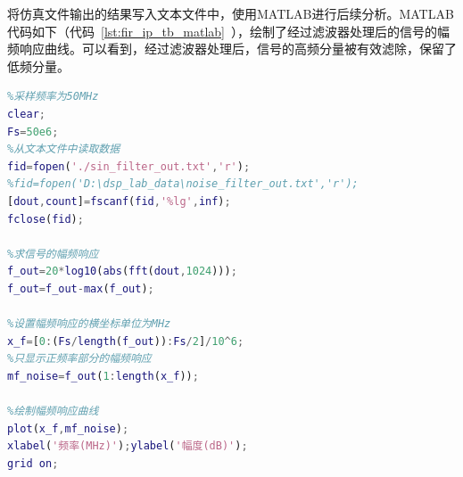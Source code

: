 将仿真文件输出的结果写入文本文件中，使用MATLAB进行后续分析。MATLAB代码如下（代码~\ref{lst:fir_ip_tb_matlab}~），绘制了经过滤波器处理后的信号的幅频响应曲线。可以看到，经过滤波器处理后，信号的高频分量被有效滤除，保留了低频分量。
\begin{lstlisting}[language=matlab,caption={MATLAB结果绘图代码},label=lst:fir_ip_tb_matlab]
%sim_data_Analyse.m
%采样频率为50MHz
clear;
Fs=50e6;        
%从文本文件中读取数据
fid=fopen('./sin_filter_out.txt','r');
%fid=fopen('D:\dsp_lab_data\noise_filter_out.txt','r');
[dout,count]=fscanf(fid,'%lg',inf);
fclose(fid);

%求信号的幅频响应
f_out=20*log10(abs(fft(dout,1024)));
f_out=f_out-max(f_out);

%设置幅频响应的横坐标单位为MHz
x_f=[0:(Fs/length(f_out)):Fs/2]/10^6;
%只显示正频率部分的幅频响应
mf_noise=f_out(1:length(x_f));

%绘制幅频响应曲线
plot(x_f,mf_noise);
xlabel('频率(MHz)');ylabel('幅度(dB)');
grid on;

\end{lstlisting}

